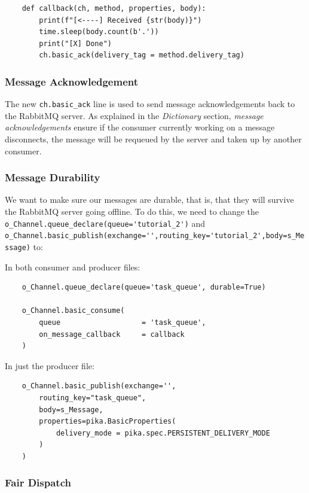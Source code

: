 \documentclass{article}
\begin{document}
\begin{verbatim}
    def callback(ch, method, properties, body):
        print(f"[<----] Received {str(body)}")
        time.sleep(body.count(b'.'))
        print("[X] Done")
        ch.basic_ack(delivery_tag = method.delivery_tag)
\end{verbatim}

\subsubsection{Message Acknowledgement}

The new \verb|ch.basic_ack| line is used to send message acknowledgements back to the RabbitMQ server. As explained in the \textit{Dictionary} section, \textit{message acknowledgements} ensure if the consumer currently working on a message disconnects, the message will be requeued by the server and taken up by another consumer.

\subsubsection{Message Durability}

We want to make sure our messages are durable, that is, that they will survive the RabbitMQ server going offline. To do this, we need to change the \verb|o_Channel.queue_declare(queue='tutorial_2')| and \verb|o_Channel.basic_publish(exchange='',routing_key='tutorial_2',body=s_Message)| to:

In both consumer and producer files:

\begin{verbatim}
    o_Channel.queue_declare(queue='task_queue', durable=True)
    
    o_Channel.basic_consume(
        queue                   = 'task_queue',
        on_message_callback     = callback
    )
\end{verbatim}


In just the producer file:

\begin{verbatim}
    o_Channel.basic_publish(exchange='',
        routing_key="task_queue",
        body=s_Message,
        properties=pika.BasicProperties(
            delivery_mode = pika.spec.PERSISTENT_DELIVERY_MODE
        )
    )
\end{verbatim}

\subsubsection{Fair Dispatch}
\end{document}

